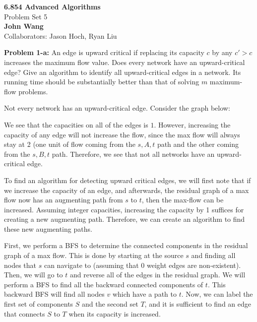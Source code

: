 \documentclass[psamsfonts]{amsart}
\newenvironment{sol}{\vspace{0.25cm}{\large \bfseries Solution:}}{\qedsymbol}
\newenvironment{prob}[1]{\begin{framed}{\large \bfseries Problem #1:}}{\end{framed}}
\newcommand{\makenewtitle}{
    \begin{center}
    {\huge \bfseries 6.854 Advanced Algorithms} \\
    Problem Set 5\\
    \vspace{0.25cm}
    {\bfseries John Wang} \\
    Collaborators: Jason Hoch, Ryan Liu
    \end{center}
    \vspace{0.5cm}
}
\begin{document}
\makenewtitle

\begin{prob}{1-a}
An edge is upward critical if replacing its capacity $c$ by any $c' > c$ increases the maximum flow value. Does every network have an upward-critical edge? Give an algorithm to identify all upward-critical edges in a network. Its running time should be substantially better than that of solving $m$ maximum-flow problems.
\end{prob}
\begin{sol}
Not every network has an upward-critical edge. Consider the graph below:
\begin{figure}[h!]
\centering
{}
\end{figure}

We see that the capacities on all of the edges is $1$. However, increasing the capacity of any edge will not increase the flow, since the max flow will always stay at 2 (one unit of flow coming from the $s, A, t$ path and the other coming from the $s, B, t$ path. Therefore, we see that not all networks have an upward-critical edge. 

To find an algorithm for detecting upward critical edges, we will first note that if we increase the capacity of an edge, and afterwards, the residual graph of a max flow now has an augmenting path from $s$ to $t$, then the max-flow can be increased. Assuming integer capacities, increasing the capacity by 1 suffices for creating a new augmenting path. Therefore, we can create an algorithm to find these new augmenting paths.

First, we perform a BFS to determine the connected components in the residual graph of a max flow. This is done by starting at the source $s$ and finding all nodes that $s$ can navigate to (assuming that 0 weight edges are non-existent). Then, we will go to $t$ and reverse all of the edges in the residual graph. We will perform a BFS to find all the backward connected components of $t$. This backward BFS will find all nodes $v$ which have a path to $t$. Now, we can label the first set of components $S$ and the second set $T$, and it is sufficient to find an edge that connects $S$ to $T$ when its capacity is increased. 


\end{sol}
\end{document}
